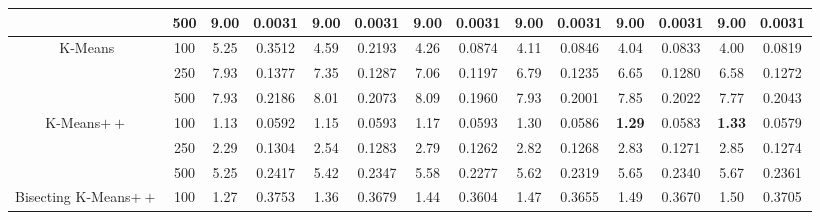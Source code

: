 \documentclass[preprint,12pt]{elsarticle}
\begin{document}
\begin{table}[!t]
{\begin{tabular}{cc|cccccccccccc}
                                       & 500    & 9.00          & 0.0031                    & 9.00          & 0.0031                    & 9.00          & 0.0031                    & 9.00          & 0.0031                    & 9.00          & 0.0031                    & 9.00          & 0.0031          \\ \hline
\multirow{3}{*}{K-Means}               & 100    & 5.25          & 0.3512                    & 4.59          & 0.2193                    & 4.26          & 0.0874                    & 4.11          & 0.0846                    & 4.04          & 0.0833                    & 4.00          & 0.0819          \\
                                       & 250    & 7.93          & 0.1377                    & 7.35          & 0.1287                    & 7.06          & 0.1197                    & 6.79          & 0.1235                    & 6.65          & 0.1280                    & 6.58          & 0.1272          \\
                                       & 500    & 7.93          & 0.2186                    & 8.01          & 0.2073                    & 8.09          & 0.1960                    & 7.93          & 0.2001                    & 7.85          & 0.2022                    & 7.77          & 0.2043          \\ \hline
\multirow{3}{*}{K-Means$++$}           & 100    & 1.13          & 0.0592                    & 1.15          & 0.0593                    & 1.17          & 0.0593                    & 1.30          & 0.0586                    & \textbf{1.29} & 0.0583                    & \textbf{1.33} & 0.0579          \\
                                       & 250    & 2.29          & 0.1304                    & 2.54          & 0.1283                    & 2.79          & 0.1262                    & 2.82          & 0.1268                    & 2.83          & 0.1271                    & 2.85          & 0.1274          \\
                                       & 500    & 5.25          & 0.2417                    & 5.42          & 0.2347                    & 5.58          & 0.2277                    & 5.62          & 0.2319                    & 5.65          & 0.2340                    & 5.67          & 0.2361          \\ \hline
\multirow{3}{*}{Bisecting K-Means$++$} & 100    & 1.27          & 0.3753                    & 1.36          & 0.3679                    & 1.44          & 0.3604                    & 1.47          & 0.3655                    & 1.49          & 0.3670                    & 1.50          & 0.3705          \\

\end{tabular}}
\end{table}
\end{document}
